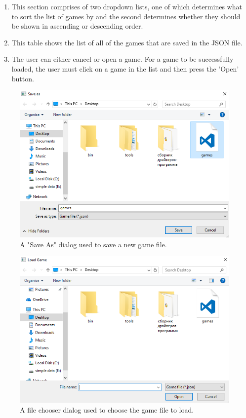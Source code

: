 \documentclass[twoside, 12pt]{report}
\begin{document}
\begin{enumerate}[label=(\Alph*)]
	\item This section comprises of two dropdown lists, one of which determines what to sort the list of games by and the second determines whether they should be shown in ascending or descending order.
	\item This table shows the list of all of the games that are saved in the JSON file.
	\item The user can either cancel or open a game. For a game to be successfully loaded, the user must click on a game in the list and then press the 'Open' button.
\end{enumerate}
\begin{figure}[H]
\centering
	\includegraphics[width=1.0\textwidth]{images/screenshots/save-as-dialog}
	\caption{A "Save As" dialog used to save a new game file.}
\end{figure}
\begin{figure}[H]
\centering
	\includegraphics[width=1.0\textwidth]{images/screenshots/load-file-dialog}
	\caption{A file chooser dialog used to choose the game file to load.}
\end{figure}
\end{document}
